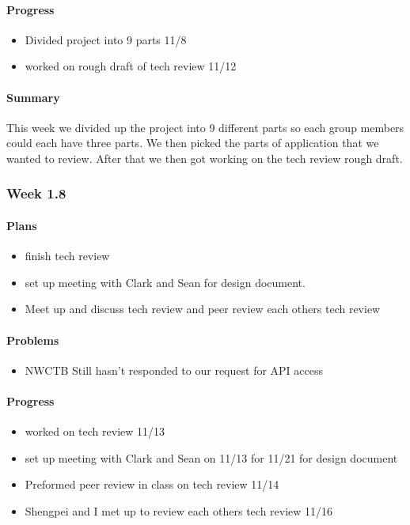 \documentclass[onecolumn, draftclsnofoot,10pt, compsoc]{article}
\begin{document}
		    \paragraph{Progress} \hfill \break
		        \begin{itemize}
		            \item Divided project into 9 parts 11/8
		            \item worked on rough draft of tech review 11/12
		        \end{itemize}
		        
		    \paragraph{Summary} \hfill \break
		        This week we divided up the project into 9 different parts so each group members could each have three parts. We then picked the parts of application that we wanted to review. After that we then got working on the tech review rough draft.\\
		
		\subsubsection{Week 1.8}
		
			\paragraph{Plans} \hfill \break
			    \begin{itemize}
			        \item finish tech review
			        \item set up meeting with Clark and Sean for design document.
			        \item Meet up and discuss tech review and peer review each others tech review
			    \end{itemize}
		
		    \paragraph{Problems} \hfill \break
		        \begin{itemize}
		            \item NWCTB Still hasn't responded to our request for API access
		        \end{itemize}
		
		    \paragraph{Progress} \hfill \break
		        \begin{itemize}
		            \item worked on tech review 11/13
		            \item set up meeting with Clark and Sean on 11/13 for 11/21 for design document
		            \item Preformed peer review in class on tech review 11/14
		            \item Shengpei and I met up to review each others tech review 11/16
		        \end{itemize}
\end{document}
